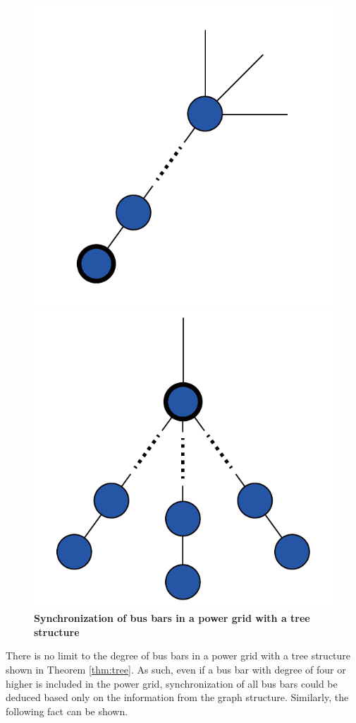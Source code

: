 \documentclass[tombow,dvipdfmx]{corona-a5-1.1}
\begin{document}
\begin{figure}[t]
  \centering
  {
  \begin{minipage}{0.40\linewidth}
    \centering
    \includegraphics[width = .50\linewidth]{figs/treesub}
    \subcaption{ }
  \end{minipage}
  \begin{minipage}{0.40\linewidth}
    \centering
    \includegraphics[width = .50\linewidth]{figs/tree}
    \subcaption{ }
  \end{minipage}
  \medskip
  \caption{\textbf{Synchronization of bus bars in a power grid with a tree structure}}
  \label{fig:treepr}
  }
\medskip
\end{figure}
There is no limit to the degree of bus bars in a power grid with a tree structure shown in Theorem \ref{thm:tree}.
As such, even if a bus bar with degree of four or higher is included in the power grid, synchronization of all bus bars could be deduced based only on the information from the graph structure.
Similarly, the following fact can be shown.
\end{document}
